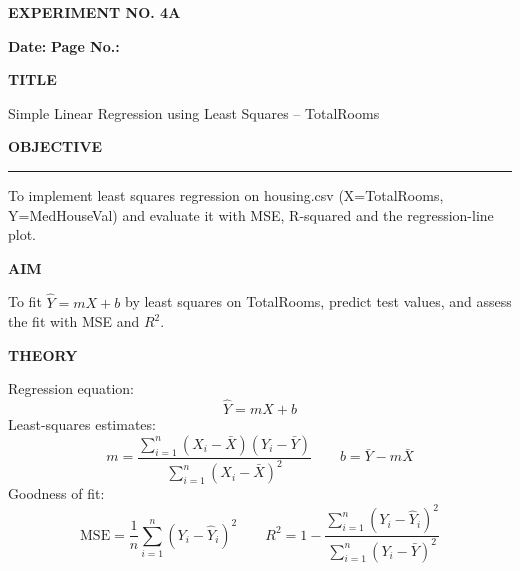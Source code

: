 \documentclass[11pt,twoside]{article}
\newcommand{\expheading}[1]{{\fontsize{14}{17}\selectfont\textbf{#1}\par}}
\newcommand{\fullrule}{\noindent\rule{\textwidth}{0.6pt}\par}
\begin{document}
{\setlength{\parskip}{1pt}\setlength{\abovedisplayskip}{2pt}\setlength{\belowdisplayskip}{2pt}
\begin{center}
\expheading{EXPERIMENT NO. 4A}
\end{center}
\vspace{2pt}

\noindent\textbf{Date:} \underline{\hspace{2.6cm}} \hfill \textbf{Page No.:} \underline{\hspace{2.6cm}}\par
\vspace{6pt}

\expheading{TITLE}
\vspace{4pt}
\noindent Simple Linear Regression using Least Squares -- TotalRooms\par
\vspace{4pt}

\expheading{OBJECTIVE}
\vspace{2pt}
\fullrule
\vspace{4pt}
\noindent To implement least squares regression on housing.csv (X=TotalRooms, Y=MedHouseVal) and evaluate it with MSE, R-squared and the regression-line plot. \par
\vspace{4pt}

\expheading{AIM}
\vspace{4pt}
\noindent To fit $\hat{Y}=mX+b$ by least squares on TotalRooms, predict test values, and assess the fit with MSE and $R^2$. \par
\vspace{4pt}

\expheading{THEORY}
\vspace{4pt}
Regression equation:
\[\hat{Y}=mX+b\]
Least-squares estimates:
\[m=\frac{\sum_{i=1}^{n}(X_i-\bar{X})(Y_i-\bar{Y})}{\sum_{i=1}^{n}(X_i-\bar{X})^2}\qquad b=\bar{Y}-m\bar{X}\]
Goodness of fit:
\[\mathrm{MSE}=\frac{1}{n}\sum_{i=1}^{n}(Y_i-\hat{Y}_i)^2\qquad R^2=1-\frac{\sum_{i=1}^{n}(Y_i-\hat{Y}_i)^2}{\sum_{i=1}^{n}(Y_i-\bar{Y})^2}\]
\vspace{4pt}

}
\end{document}
